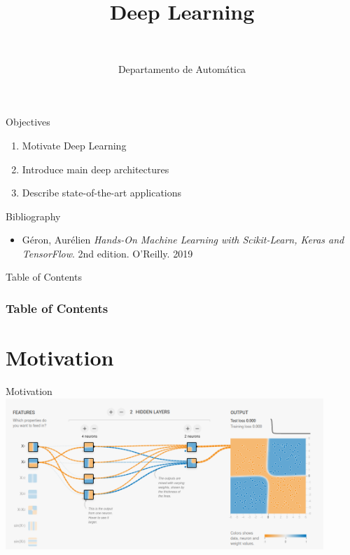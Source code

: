 \documentclass[10pt,compress]{beamer} %
\title[Deep Learning]{Deep Learning}
\author{\asignatura\\\carrera}
\institute{}
\date{Departamento de Automática}
\begin{document}
{\titlepageBlue
    \begin{frame}
        \titlepage
    \end{frame}
}

\institute{\asignatura}

\begin{frame}[plain]{}
   \begin{block}{Objectives}
      \begin{enumerate}
         \item Motivate Deep Learning
		 \item Introduce main deep architectures
         \item Describe state-of-the-art applications
      \end{enumerate} 
   \end{block}

   \begin{block}{Bibliography}
	\begin{itemize}
        \item Géron, Aurélien \textit{Hands-On Machine Learning with Scikit-Learn, Keras and TensorFlow}. 2nd edition. O'Reilly. 2019
	\end{itemize}
   \end{block}
\end{frame}

{
\begin{frame}[shrink]{Table of Contents}

 	\frametitle{Table of Contents}
  	\begin{multicols}{2}
  		\tableofcontents
    \end{multicols}

\end{frame}
}

\section{Motivation}
\begin{frame}{Motivation}
	\includegraphics[width=0.9\textwidth]{figs/playground.png}
\end{frame}
\end{document}
